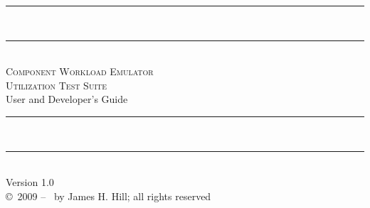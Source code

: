 
\newcommand{\hr}{\rule{\linewidth}{0.5mm}}

\begin{titlepage}
\begin{center}

\hr
\\
\hr
\\[0.1in]
\textsc{\Huge Component Workload Emulator
\\[0.05in]
Utilization Test Suite}
\\[0.3in]
{\huge User and Developer's Guide}
\\[0.1in]
\hr
\\
\hr
\\
\vfill
{\large Version 1.0}
\\
{\large \copyright\ 2009 -- \the\year \ by James H. Hill; all rights reserved}
\end{center}
\end{titlepage}
